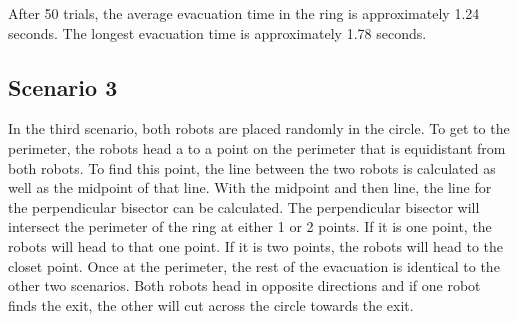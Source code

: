 \documentclass[12pt,letterpaper]{article}
\begin{document}
        After 50 trials, the average evacuation time in the ring is approximately 1.24 seconds. The longest evacuation time is approximately 1.78 seconds.

    \subsection{Scenario 3}
        In the third scenario, both robots are placed randomly in the circle. To get to the perimeter, the robots head a to a point on the perimeter that is equidistant from both robots. To find this point, the line between the two robots is calculated as well as the midpoint of that line. With the midpoint and then line, the line for the perpendicular bisector can be calculated. The perpendicular bisector will intersect the perimeter of the ring at either 1 or 2 points. If it is one point, the robots will head to that one point. If it is two points, the robots will head to the closet point. Once at the perimeter, the rest of the evacuation is identical to the other two scenarios. Both robots head in opposite directions and if one robot finds the exit, the other will cut across the circle towards the exit.
        
\end{document}
